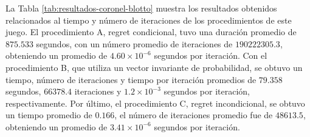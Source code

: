 La Tabla \ref{tab:resultados-coronel-blotto} muestra los resultados obtenidos relacionados al tiempo y número de iteraciones de los procedimientos de este juego. El procedimiento A, regret condicional, tuvo una duración promedio de $875.533$ segundos, con un número promedio de iteraciones de $190222305.3$, obteniendo un promedio de $4.60 {\times} 10^{-6}$ segundos por iteración. Con el procedimiento B, que utiliza un vector invariante de probabilidad, se obtuvo un tiempo, número de iteraciones y tiempo por iteración promedios de $79.358$ segundos, $66378.4$ iteraciones y $1.2 {\times} 10^{-3}$ segundos por iteración, respectivamente. Por último, el procedimiento C, regret incondicional, se obtuvo un tiempo promedio de $0.166$, el número de iteraciones promedio fue de $48613.5$, obteniendo un promedio de $3.41 {\times} 10^{-6}$ segundos por iteración.

